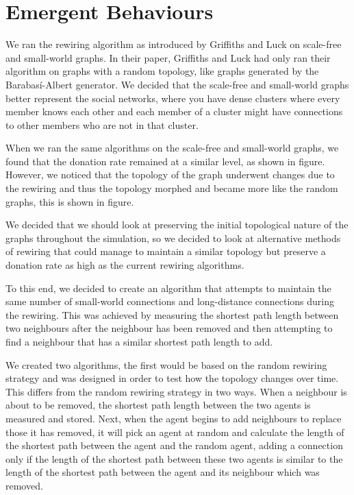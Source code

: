 \section{Emergent Behaviours}

We ran the rewiring algorithm as introduced by Griffiths and Luck on scale-free and small-world graphs. In their paper, Griffiths and Luck had only ran their algorithm on graphs with a random topology, like graphs generated by the Barabasí-Albert generator. We decided that the scale-free and small-world graphs better represent the social networks, where you have dense clusters where every member knows each other and each member of a cluster might have connections to other members who are not in that cluster.

When we ran the same algorithms on the scale-free and small-world graphs, we found that the donation rate remained at a similar level, as shown in figure. However, we noticed that the topology of the graph underwent changes due to the rewiring and thus the topology morphed and became more like the random graphs, this is shown in figure.

We decided that we should look at preserving the initial topological nature of the graphs throughout the simulation, so we decided to look at alternative methods of rewiring that could manage to maintain a similar topology but preserve a donation rate as high as the current rewiring algorithms.

To this end, we decided to create an algorithm that attempts to maintain the same number of small-world connections and long-distance connections during the rewiring. This was achieved by measuring the shortest path length between two neighbours after the neighbour has been removed and then attempting to find a neighbour that has a similar shortest path length to add.

We created two algorithms, the first would be based on the random rewiring strategy and was designed in order to test how the topology changes over time. This differs from the random rewiring strategy in two ways. When a neighbour is about to be removed, the shortest path length between the two agents is measured and stored. Next, when the agent begins to add neighbours to replace those it has removed, it will pick an agent at random and calculate the length of the shortest path between the agent and the random agent, adding a connection only if the length of the shortest path between these two agents is similar to the length of the shortest path between the agent and its neighbour which was removed.

